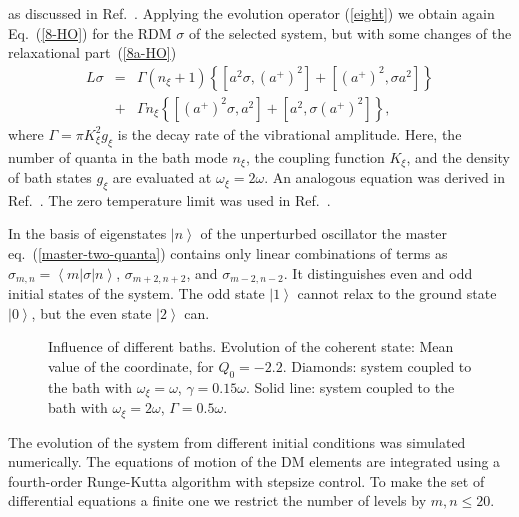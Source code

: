 \documentclass[12pt,twoside,a4paper]{report}
\begin{document}
as  discussed in Ref.~\cite{14}.
%
%
Applying the evolution operator (\ref{eight}) we obtain again Eq.~(\ref{8-HO})
for the RDM $\sigma$
of the selected system,
but with some changes of the relaxational part~(\ref{8a-HO})
\begin{eqnarray}
L 
\sigma 
       &=& 
         \Gamma (n_\xi + 1)
         \left\{ 
             \left[  
                    a^2
                      \sigma, 
                (a^+)^2
             \right]   
           + \left[ 
                (a^+)^2,
                \sigma
                    a^2 
              \right]
         \right\} \nonumber \\
 &+& \Gamma n_\xi
         \left\{ 
              \left[ 
                   (a^+)^2 \sigma, a^2 
             \right]   
           + \left[ 
                a^2, \sigma (a^+)^2 
              \right]
         \right\} ,
\label{master-two-quanta}
\end{eqnarray}
where $ \Gamma =\pi K_\xi^2 g_\xi $ is the decay rate of the vibrational
amplitude. 
Here, the number of quanta in the bath mode
$n_\xi$, 
the coupling function
$K_\xi$, 
and the density of bath states
$g_\xi$ are evaluated at 
$\omega_\xi=2 \omega$.
An analogous equation was derived in Ref.~\cite{shen67}. 
The zero temperature limit was used in Ref.~\cite{14}.

In the basis of eigenstates  
$\left| n \right\rangle$
of the unperturbed oscillator
the master eq.~(\ref{master-two-quanta})
contains only linear combinations of terms as
$\sigma_{m,n}=\left\langle m \right|\sigma \left|n\right\rangle$,  
$\sigma_{m+2,n+2}$, and   $\sigma_{m-2,n-2}$.
It distinguishes even and odd initial states of the system.
The odd state $\left| 1 \right\rangle$ 
cannot relax to the ground state $\left| 0 \right\rangle$,
but the even state $\left| 2 \right\rangle$ can. 
\footnotesize\begin{figure}[!h]\centering
  \parbox{10cm}
  {\rule{0cm}{0cm}
\epsfxsize=9cm}
\caption[Influence of different baths. Coordinate mean value.]
{\small  Influence of different baths.
  Evolution of the coherent state:
  Mean value of the coordinate,
  for $Q_0=-2.2$.
  Diamonds: system coupled to
  the bath with $\omega_\xi=\omega$, $\gamma=0.15\omega$.
  Solid line: system coupled to
  the bath with $\omega_\xi=2\omega$, $\Gamma=0.5\omega$. 
\label{fig-double-bath}
}
\end{figure}\normalsize


The evolution of the system from different initial conditions
was simulated numerically.
The equations of motion of the  DM  elements
are integrated using a fourth-order 
Runge-Kutta algorithm with stepsize control.
To make the set of differential equations a finite one
we restrict the number 
of levels by $m,n \leq 20$. 
\end{document}
